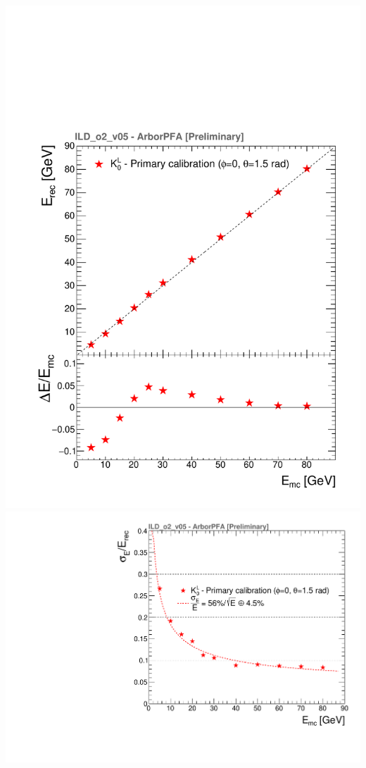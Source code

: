 \documentclass[8pt]{beamer}
\begin{document}
\begin{frame}
\begin{minipage}{0.39\linewidth}
\begin{center}
        \includegraphics[width=0.8\linewidth]{kaon0L_primary_calibration_erec_2.pdf} \\
        \includegraphics[width=0.8\linewidth]{kaon0L_primary_calibration_eresol_2.pdf}
      \end{center}
    \end{minipage}
  \end{frame}
\end{document}
